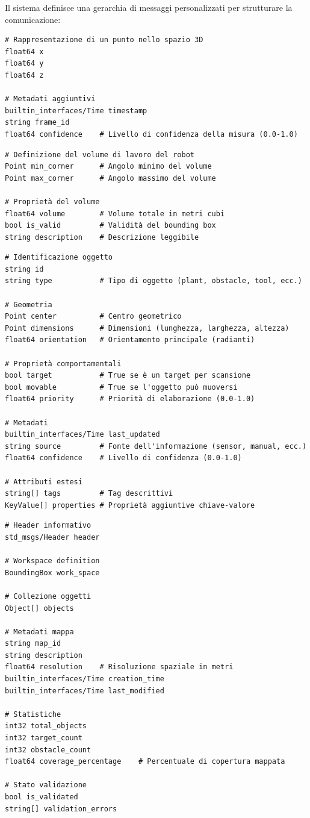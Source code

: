 \documentclass[12pt,a4paper,twoside,openright]{book}
\begin{document}
Il sistema definisce una gerarchia di messaggi personalizzati per strutturare la comunicazione:

\begin{lstlisting}[caption={Point.msg - Coordinata 3D estesa}]
# Rappresentazione di un punto nello spazio 3D
float64 x
float64 y  
float64 z

# Metadati aggiuntivi
builtin_interfaces/Time timestamp
string frame_id
float64 confidence    # Livello di confidenza della misura (0.0-1.0)
\end{lstlisting}

\begin{lstlisting}[caption={BoundingBox.msg - Volume di lavoro}]
# Definizione del volume di lavoro del robot
Point min_corner      # Angolo minimo del volume
Point max_corner      # Angolo massimo del volume

# Proprietà del volume
float64 volume        # Volume totale in metri cubi
bool is_valid         # Validità del bounding box
string description    # Descrizione leggibile
\end{lstlisting}

\begin{lstlisting}[caption={Object.msg - Rappresentazione oggetti complessi}]
# Identificazione oggetto
string id
string type           # Tipo di oggetto (plant, obstacle, tool, ecc.)

# Geometria
Point center          # Centro geometrico
Point dimensions      # Dimensioni (lunghezza, larghezza, altezza)
float64 orientation   # Orientamento principale (radianti)

# Proprietà comportamentali
bool target           # True se è un target per scansione
bool movable          # True se l'oggetto può muoversi
float64 priority      # Priorità di elaborazione (0.0-1.0)

# Metadati
builtin_interfaces/Time last_updated
string source         # Fonte dell'informazione (sensor, manual, ecc.)
float64 confidence    # Livello di confidenza (0.0-1.0)

# Attributi estesi
string[] tags         # Tag descrittivi
KeyValue[] properties # Proprietà aggiuntive chiave-valore
\end{lstlisting}

\begin{lstlisting}[caption={Map.msg - Mappa completa dell'ambiente}]
# Header informativo
std_msgs/Header header

# Workspace definition
BoundingBox work_space

# Collezione oggetti
Object[] objects

# Metadati mappa
string map_id
string description
float64 resolution    # Risoluzione spaziale in metri
builtin_interfaces/Time creation_time
builtin_interfaces/Time last_modified

# Statistiche
int32 total_objects
int32 target_count
int32 obstacle_count
float64 coverage_percentage    # Percentuale di copertura mappata

# Stato validazione
bool is_validated
string[] validation_errors
\end{lstlisting}
\end{document}
